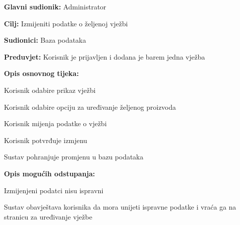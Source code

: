 					\noindent {}
					\begin{packed_item}
						
						\item \textbf{Glavni sudionik:} Administrator
						\item  \textbf{Cilj:} Izmijeniti podatke o željenoj vježbi
						\item  \textbf{Sudionici:} Baza podataka
						\item  \textbf{Preduvjet:} Korisnik je prijavljen i dodana je barem jedna vježba
						\item  \textbf{Opis osnovnog tijeka:}
						
						\item[] \begin{packed_enum}
							
							\item Korisnik odabire prikaz vježbi
							\item Korisnik odabire opciju za uređivanje željenog proizvoda
							\item Korisnik mijenja podatke o vježbi
							\item Korisnik potvrđuje izmjenu
							\item Sustav pohranjuje promjenu u bazu podataka
							
						\end{packed_enum}
						
						\item  \textbf{Opis mogućih odstupanja:}
						
						\item[] \begin{packed_item}
							
							\item[4.a] Izmijenjeni podatci nisu ispravni 
							\item[] \begin{packed_enum}
								
								\item Sustav obavještava korisnika da mora unijeti ispravne podatke i vraća ga na stranicu za uređivanje vježbe
								
							\end{packed_enum}
							
						\end{packed_item}	
						
					\end{packed_item}
					
